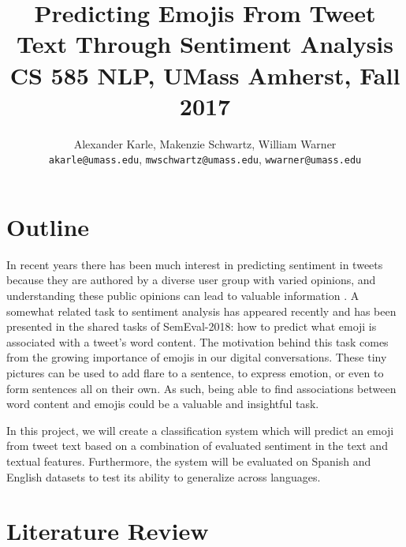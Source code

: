 \documentclass[10pt]{article}
\title{\textbf{Predicting Emojis From Tweet Text Through Sentiment Analysis} \\
\large CS 585 NLP, UMass Amherst, Fall 2017}
\author{
  Alexander Karle, Makenzie Schwartz, William Warner \\
  \texttt{akarle@umass.edu}, \texttt{mwschwartz@umass.edu}, \texttt{wwarner@umass.edu} }
\begin{document}
\maketitle

\section{Outline}

In recent years there has been much interest in predicting sentiment in tweets because they are authored by a diverse user group with varied opinions, and understanding these public opinions can lead to valuable information \cite{pak2010twitter}.
A somewhat related task to sentiment analysis has appeared recently and has been presented in the shared tasks of SemEval-2018: how to predict what emoji is associated with a tweet's word content. The motivation behind this task comes 
from the growing importance of emojis in our digital conversations. These tiny pictures can be used to add flare to a sentence, to express emotion, or even to form sentences all on their own. As such, being able to find associations between word content and emojis could be a valuable and insightful task.

In this project, we will create a classification system which will predict an emoji from tweet text based on a combination of evaluated sentiment in the text and textual features. Furthermore, the system will be evaluated on Spanish and English datasets to test its ability to generalize across languages.%



\section{Literature Review}
\end{document}

